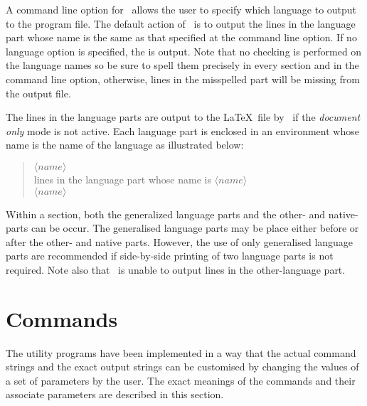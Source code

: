 A command line option for \tangle\ allows the user to specify which
language to output to the program file.  The default action of
\tangle\ is to output the lines in the language part whose name is the
same as that specified at the command line option.  If no language
option is specified, the  is output.  Note that no
checking is performed on the language names so be sure to spell them
precisely in every section and in the command line option, otherwise,
lines in the misspelled part will be missing from the output file.

The lines in the language parts are output to the \LaTeX\ file by
\weave\ if the {\it document only\/} mode is not active. Each language
part is enclosed in an environment whose name is the name of the
language as illustrated below:
\begin{center}\it
\begin{boxedminipage}{5in}
\begin{quote}
  $\langle name\rangle$ \\
lines in the language part whose name is $\langle name\rangle$\\
  $\langle name\rangle$ 
\end{quote}
\end{boxedminipage}
\end{center}

Within a section, both the generalized language parts and the other-
and native-parts can be occur. The generalised language parts may be
place either before or after the other- and native parts. However, the
use of only generalised language parts are recommended if side-by-side
printing of two language parts is not required. Note also that
\tangle\ is unable to output lines in the other-language part.

\section{Commands}

The utility programs have been implemented in a way that the actual command
strings and the exact output strings can be customised by changing the
values of a set of parameters by the user. The exact meanings of the
commands and their associate parameters are described in this section.
\vspace{20pt}

\noindent\cmdrule

